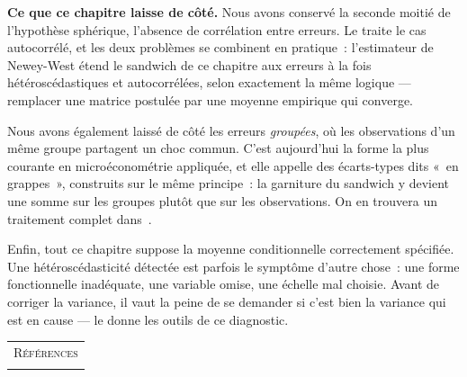 \documentclass[10pt]{beamer}
\begin{document}
\begin{notes}

  \textbf{Ce que ce chapitre laisse de côté.} Nous avons conservé la seconde
  moitié de l'hypothèse sphérique, l'absence de corrélation entre erreurs. Le
   traite le cas autocorrélé, et les deux problèmes se combinent
  en pratique~: l'estimateur de Newey-West étend le sandwich de ce chapitre aux
  erreurs à la fois hétéroscédastiques et autocorrélées, selon exactement la
  même logique — remplacer une matrice postulée par une moyenne empirique qui
  converge.

  \bigskip

  Nous avons également laissé de côté les erreurs \emph{groupées}, où les
  observations d'un même groupe partagent un choc commun. C'est aujourd'hui la
  forme la plus courante en microéconométrie appliquée, et elle appelle des
  écarts-types dits «~en grappes~», construits sur le même principe~: la
  garniture du sandwich y devient une somme sur les groupes plutôt que sur les
  observations. On en trouvera un traitement complet dans~\cite{Greene2017}.

  \bigskip

  Enfin, tout ce chapitre suppose la moyenne conditionnelle correctement
  spécifiée. Une hétéroscédasticité détectée est parfois le symptôme d'autre
  chose~: une forme fonctionnelle inadéquate, une variable omise, une échelle
  mal choisie. Avant de corriger la variance, il vaut la peine de se demander
  si c'est bien la variance qui est en cause — le  donne les
  outils de ce diagnostic.

\end{notes}


\begin{notes}

  \begin{center}
    \begin{tabular}{c}
      \\
      \Huge{\textsc{Références}}\\
      \\
    \end{tabular}
  \end{center}

  \bigskip

  \nocite{Greene2017}

  \nocite{Schmidt1976}

  \sloppy
  \printbibliography

\end{notes}
\end{document}
